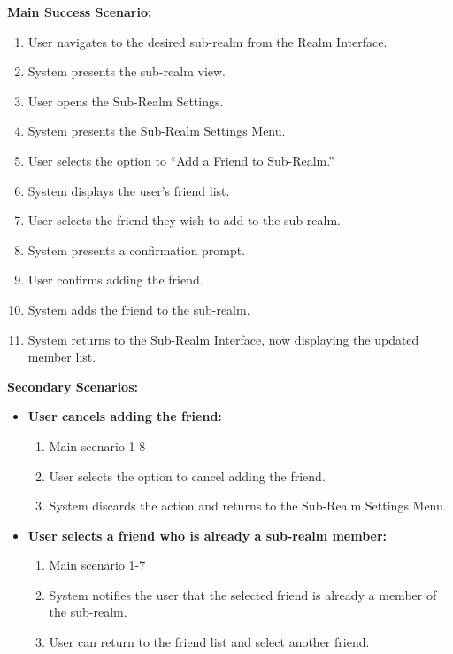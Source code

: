 \documentclass{article}
\begin{document}
\begin{enumerate}[label=\textbf{UC\arabic*}]
        \textbf{Main Success Scenario:}
        \begin{enumerate}[label=\textbf{\arabic*.}]
            \item User navigates to the desired sub-realm from the Realm Interface.
            \item System presents the sub-realm view.
            \item User opens the Sub-Realm Settings.
            \item System presents the Sub-Realm Settings Menu.
            \item User selects the option to “Add a Friend to Sub-Realm.”
            \item System displays the user's friend list.
            \item User selects the friend they wish to add to the sub-realm.
            \item System presents a confirmation prompt.
            \item User confirms adding the friend.
            \item System adds the friend to the sub-realm.
            \item System returns to the Sub-Realm Interface, now displaying the updated member list.
        \end{enumerate}
        
        \textbf{Secondary Scenarios:}
        \begin{itemize}
            \item[{}] \textbf{User cancels adding the friend:}
            \begin{enumerate}[label=\textbf{\arabic*.}]
                \item Main scenario 1-8
                \item User selects the option to cancel adding the friend.
                \item System discards the action and returns to the Sub-Realm Settings Menu.
            \end{enumerate}
            
            \item[{}] \textbf{User selects a friend who is already a sub-realm member:}
            \begin{enumerate}[label=\textbf{\arabic*.}]
                \item Main scenario 1-7
                \item System notifies the user that the selected friend is already a member of the sub-realm.
                \item User can return to the friend list and select another friend.
            \end{enumerate}
            

\end{itemize}
\end{enumerate}
\end{document}
